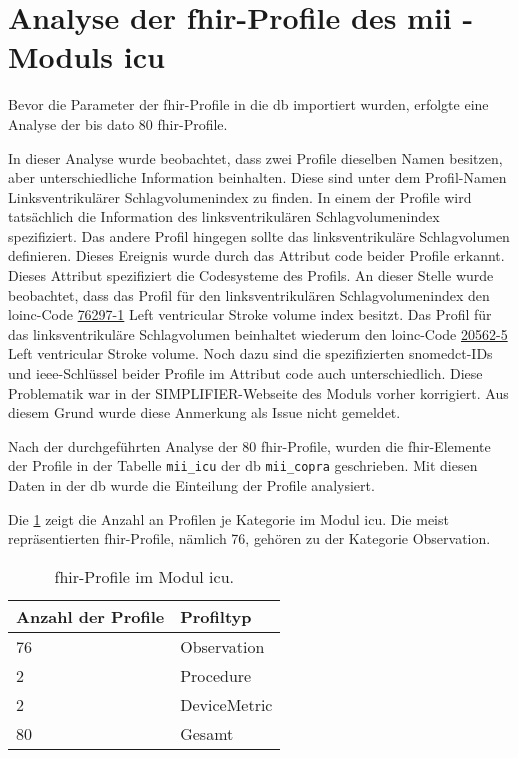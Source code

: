 \section{Analyse der \acs{fhir}-Profile des \acs{mii} - Moduls \acs{icu}} \label{sec:fhiricuresult}

Bevor die Parameter der \ac{fhir}-Profile in die \ac{db} importiert wurden, erfolgte eine Analyse der bis dato 80 \ac{fhir}-Profile. 

In dieser Analyse wurde beobachtet, dass zwei Profile dieselben Namen besitzen, aber unterschiedliche Information beinhalten. Diese sind unter dem Profil-Namen \glqq Linksventrikulärer Schlagvolumenindex\grqq{} zu finden. In einem der Profile wird tatsächlich die Information des linksventrikulären Schlagvolumenindex spezifiziert. Das andere Profil hingegen sollte das linksventrikuläre Schlagvolumen definieren. Dieses Ereignis wurde durch das Attribut \glqq code\grqq{} beider Profile erkannt. Dieses Attribut spezifiziert die Codesysteme des Profils. An dieser Stelle wurde beobachtet, dass das Profil für den linksventrikulären Schlagvolumenindex den \ac{loinc}-Code \href{https://loinc.org/76297-1/}{76297-1} \glqq Left ventricular Stroke volume index\grqq{} besitzt. Das Profil für das linksventrikuläre Schlagvolumen beinhaltet wiederum den \ac{loinc}-Code \href{https://loinc.org/20562-5/}{20562-5} \glqq Left ventricular Stroke volume\grqq{}. Noch dazu sind die spezifizierten \ac{snomedct}-IDs und \ac{ieee}-Schlüssel beider Profile im Attribut \glqq code\grqq{} auch unterschiedlich. Diese Problematik war in der SIMPLIFIER-Webseite des Moduls vorher korrigiert. Aus diesem Grund wurde diese Anmerkung als Issue nicht gemeldet.

Nach der durchgeführten Analyse der 80 \acs{fhir}-Profile, wurden die \ac{fhir}-Elemente der Profile in der Tabelle \texttt{mii\_icu} der \ac{db} \texttt{mii\_copra} geschrieben. Mit diesen Daten in der \ac{db} wurde die Einteilung der Profile analysiert.

Die \ref{tab:proficu} zeigt die Anzahl an Profilen je Kategorie im Modul \glqq\ac{icu}\grqq{}. Die meist repräsentierten \ac{fhir}-Profile, nämlich 76, gehören zu der Kategorie \glqq Observation\grqq{}.

\begin{table}[ht]
	\centering 
	\caption[\acs{fhir}-Profile im Modul \glqq\acs{icu}\grqq{}]{\acs{fhir}-Profile im Modul \glqq\acs{icu}\grqq{}.}
	\label{tab:proficu}
	\begin{tabular}{|l|l|}
		\hline
		\bfseries Anzahl der Profile & \bfseries Profiltyp \\ \hline
		76 & Observation \\ \hline
		2 & Procedure \\ \hline   
		2 & DeviceMetric \\ \hline
		80 & Gesamt \\ \hline
	\end{tabular}
\end{table}

